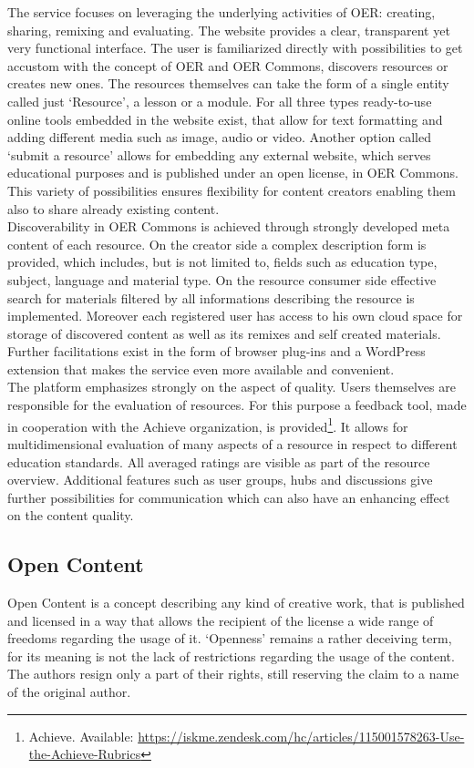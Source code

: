 \documentclass[a4paper]{article}
\begin{document}
\noindent
The service focuses on leveraging the underlying activities of OER: creating, sharing, remixing and evaluating. The website provides a clear, transparent yet very functional interface. The user is familiarized directly with possibilities to get accustom with the concept of OER and OER Commons, discovers resources or creates new ones. The resources themselves can take the form of a single entity called just `Resource', a lesson or a module. For all three types ready-to-use online tools embedded in the website exist, that allow for text formatting and adding different media such as image, audio or video. Another option called `submit a resource' allows for embedding any external website, which serves educational purposes and is published under an open license, in OER Commons. This variety of possibilities ensures flexibility for content creators enabling them also to share already existing content.\\

\noindent
Discoverability in OER Commons is achieved through strongly developed meta content of each resource. On the creator side a complex description form is provided, which includes, but is not limited to, fields such as education type, subject, language and material type. On the resource consumer side effective search for materials filtered by all informations describing the resource is implemented. Moreover each registered user has access to his own cloud space for storage of discovered content as well as its remixes and self created materials. Further facilitations exist in the form of browser plug-ins and a WordPress extension that makes the service even more available and convenient. \\ 
 
\noindent
The platform emphasizes strongly on the aspect of quality. Users themselves are responsible for the evaluation of resources. For this purpose a feedback tool, made in cooperation with the Achieve organization, is provided\footnote{Achieve. Available:  \url{https://iskme.zendesk.com/hc/articles/115001578263-Use-the-Achieve-Rubrics}}. It allows for multidimensional evaluation of many aspects of a resource in respect to different education standards. All averaged ratings are visible as part of the resource overview. Additional features such as user groups, hubs and discussions give further possibilities for communication which can also have an enhancing effect on the content quality. 

\subsection{Open Content}
Open Content is a concept describing any kind of creative work, that is published and licensed in a way that allows the recipient of the license a wide range of freedoms regarding the usage of it. `Openness' remains a rather deceiving term, for its meaning is not the lack of restrictions regarding the usage of the content. The authors resign only a part of their rights, still reserving the claim to a name of the original author. \\ 
\end{document}

